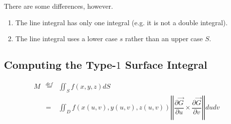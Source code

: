 \documentclass{article}
\newcommand{\norm}[1]{\left|\left|#1\right|\right|}
\begin{document}
There are some differences, however.

\begin{enumerate}
  \item The line integral has only one integral (e.g. it is not a double integral).
  \item The line integral uses a lower case $s$ rather than an upper case $S$.
\end{enumerate}

\subsection*{Computing the Type-$1$ Surface Integral}

\[
\begin{array}{rcl}
  M & \overset{def}{=} & \iint_S f(x,y,z) dS \\
    &               =  & \iint_D f(x(u,v), y(u,v), z(u,v))\norm{\dfrac{\partial \vec{G}}{\partial u} \times \dfrac{\partial \vec{G}}{\partial v}} du dv
\end{array}
\]
\end{document}
